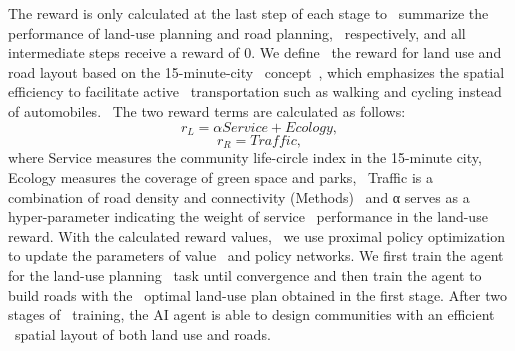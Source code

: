 The reward is only calculated at the last step of each stage to \
summarize the performance of land-use planning and road planning, \
respectively, and all intermediate steps receive a reward of 0. We define \
the reward for land use and road layout based on the 15-minute-city \
concept\
, which emphasizes the spatial efficiency to facilitate active \
transportation such as walking and cycling instead of automobiles. \
The two reward terms are calculated as follows:
\begin{equation}
    r_L = \alpha Service +Ecology,\label{land-use-planning}
\end{equation}
\begin{equation}
    r_R = Traffic,\label{road-planning}
\end{equation}
where Service measures the community life-circle index in the 15-minute city, Ecology measures the coverage of green space and parks, \
Traffic is a combination of road density and connectivity (Methods) \
and α serves as a hyper-parameter indicating the weight of service \
performance in the land-use reward. With the calculated reward values, \
we use proximal policy optimization to update the parameters of value \
and policy networks. We first train the agent for the land-use planning \
task until convergence and then train the agent to build roads with the \
optimal land-use plan obtained in the first stage. After two stages of \
training, the AI agent is able to design communities with an efficient \
spatial layout of both land use and roads.

